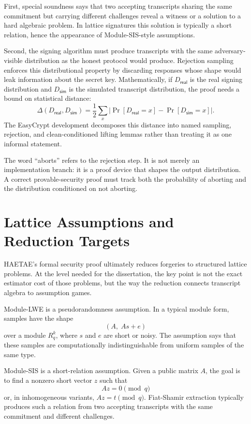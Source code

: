 First, special soundness says that two accepting transcripts sharing the same
commitment but carrying different challenges reveal a witness or a solution to a
hard algebraic problem.  In lattice signatures this solution is typically a
short relation, hence the appearance of Module-SIS-style assumptions.

Second, the signing algorithm must produce transcripts with the same
adversary-visible distribution as the honest protocol would produce.  Rejection
sampling enforces this distributional property by discarding responses whose
shape would leak information about the secret key.  Mathematically, if
\(D_{\mathsf{real}}\) is the real signing distribution and
\(D_{\mathsf{sim}}\) is the simulated transcript distribution, the proof needs
a bound on statistical distance:
\[
  \Delta(D_{\mathsf{real}},D_{\mathsf{sim}})
  =
  \frac12\sum_x
  \left|\Pr[D_{\mathsf{real}}=x]-\Pr[D_{\mathsf{sim}}=x]\right|.
\]
The EasyCrypt development decomposes this distance into named sampling,
rejection, and clean-conditioned lifting lemmas rather than treating it as one
informal statement.

The word ``aborts'' refers to the rejection step.  It is not merely an
implementation branch: it is a proof device that shapes the output
distribution.  A correct provable-security proof must track both the probability
of aborting and the distribution conditioned on not aborting.

\section{Lattice Assumptions and Reduction Targets}

HAETAE's formal security proof ultimately reduces forgeries to structured
lattice problems.  At the level needed for the dissertation, the key point is
not the exact estimator cost of those problems, but the way the reduction
connects transcript algebra to assumption games.

Module-LWE is a pseudorandomness assumption.  In a typical module form, samples
have the shape
\[
  (A,\; A s + e)
\]
over a module \(R_q^k\), where \(s\) and \(e\) are short or noisy.  The
assumption says that these samples are computationally indistinguishable from
uniform samples of the same type.

Module-SIS is a short-relation assumption.  Given a public matrix \(A\), the
goal is to find a nonzero short vector \(z\) such that
\[
  A z = 0 \pmod q
\]
or, in inhomogeneous variants, \(A z = t \pmod q\).  Fiat-Shamir extraction
typically produces such a relation from two accepting transcripts with the same
commitment and different challenges.

